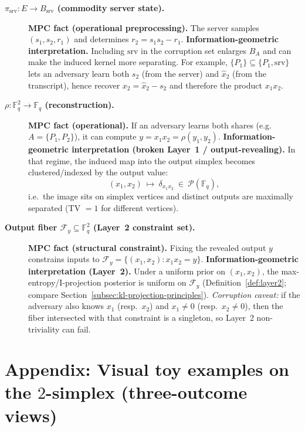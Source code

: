 \documentclass[11pt,a4paper]{article}
\theoremstyle{definition}
\theoremstyle{plain}
\newcommand{\F}{\mathbb{F}}
\newcommand{\Prob}{\mathcal{P}}
\begin{document}
\begin{description}
    \item[\textbf{$\pi_{\mathrm{srv}}:E\to B_{\mathrm{srv}}$ (commodity server state).}]
    \textbf{MPC fact (operational preprocessing).} The server samples $(s_1,s_2,r_1)$ and determines $r_2=s_1s_2-r_1$.
    \textbf{Information-geometric interpretation.} Including $\mathrm{srv}$ in the corruption set enlarges $B_A$ and can make the induced kernel more separating.
    For example, $\{P_1\}\subseteq \{P_1,\mathrm{srv}\}$ lets an adversary learn both $s_2$ (from the server) and $\hat x_2$ (from the transcript), hence recover $x_2=\hat x_2-s_2$ and therefore the product $x_1x_2$.

    \item[\textbf{$\rho:\F_q^2\to \F_q$ (reconstruction).}]
    \textbf{MPC fact (operational).} If an adversary learns both shares (e.g.\ $A=\{P_1,P_2\}$), it can compute $y=x_1x_2=\rho(y_1,y_2)$.
    \textbf{Information-geometric interpretation (broken Layer~1 / output-revealing).}
    In that regime, the induced map into the output simplex becomes clustered/indexed by the output value:
    \[
    (x_1,x_2)\ \longmapsto\ \delta_{x_1x_2}\ \in\ \Prob(\F_q),
    \]
    i.e.\ the image sits on simplex vertices and distinct outputs are maximally separated (TV $=1$ for different vertices).

    \item[\textbf{Output fiber $\mathcal{F}_y\subseteq \F_q^2$ (Layer~2 constraint set).}]
    \textbf{MPC fact (structural constraint).} Fixing the revealed output $y$ constrains inputs to $\mathcal{F}_y=\{(x_1,x_2):x_1x_2=y\}$.
    \textbf{Information-geometric interpretation (Layer~2).}
    Under a uniform prior on $(x_1,x_2)$, the max-entropy/I-projection posterior is uniform on $\mathcal{F}_y$ (Definition~\ref{def:layer2}; compare Section~\ref{subsec:kl-projection-principles}).
    \emph{Corruption caveat:} if the adversary also knows $x_1$ (resp.\ $x_2$) and $x_1\neq 0$ (resp.\ $x_2\neq 0$), then the fiber intersected with that constraint is a singleton, so Layer~2 non-triviality can fail.
\end{description}

\section{Appendix: Visual toy examples on the \texorpdfstring{$2$}{2}-simplex (three-outcome views)}
\label{app:visual-toy-simplex}
\end{document}
